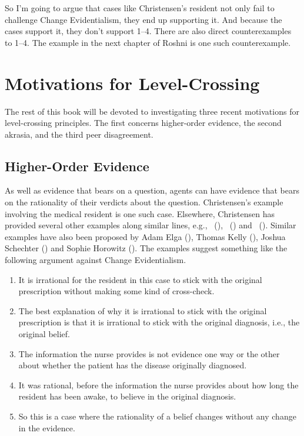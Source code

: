 \documentclass[
  10pt,
  letterpaper,
  twoside]{scrbook}
\providecommand{\tightlist}{%
  \setlength{\itemsep}{0pt}\setlength{\parskip}{0pt}}\usepackage{longtable,booktabs,array}
\begin{document}
So I'm going to argue that cases like Christensen's resident not only
fail to challenge Change Evidentialism, they end up supporting it. And
because the cases support it, they don't support 1--4. There are also
direct counterexamples to 1--4. The example in the next chapter of
{Roshni} is one such counterexample.

\section{Motivations for
Level-Crossing}\label{motivationsforlevel-crossing}

The rest of this book will be devoted to investigating three recent
motivations for level-crossing principles. The first concerns
higher-order evidence, the second akrasia, and the third peer
disagreement.

\subsection{Higher-Order Evidence}\label{higher-orderevidence}

As well as evidence that bears on a question, agents can have evidence
that bears on the rationality of their verdicts about the question.
Christensen's example involving the medical resident is one such case.
Elsewhere, Christensen has provided several other examples along similar
lines, e.g., ~(),
~() and
~(). Similar
examples have also been proposed by Adam Elga
(), Thomas Kelly
(), Joshua Schechter
() and Sophie Horowitz
(). The examples suggest something
like the following argument against Change Evidentialism.

\begin{enumerate}
\def\labelenumi{\arabic{enumi}.}
\tightlist
\item
  It is irrational for the resident in this case to stick with the
  original prescription without making some kind of cross-check.
\item
  The best explanation of why it is irrational to stick with the
  original prescription is that it is irrational to stick with the
  original diagnosis, i.e., the original belief.
\item
  The information the nurse provides is not evidence one way or the
  other about whether the patient has the disease originally diagnosed.
\item
  It was rational, before the information the nurse provides about how
  long the resident has been awake, to believe in the original
  diagnosis.
\item
  So this is a case where the rationality of a belief changes without
  any change in the evidence.
\end{enumerate}
\end{document}
